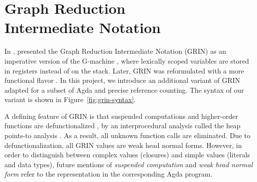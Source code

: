 \documentclass[9pt, twocolumn]{article}
\begin{document}
\section{Graph Reduction \\ Intermediate Notation}
\label{sec:grin}
In \citeyear{johnsson1991}, \citeauthor{johnsson1991} presented the Graph Reduction Intermediate Notation (GRIN) as an imperative version of the G-machine \citep{johnsson1984}, where lexically scoped variables are stored in registers instead of on the stack. 
Later, GRIN was reformulated with a more functional flavor \citep{boquist1995}.
In this project, we introduce an additional variant of GRIN adapted for a subset of Agda and precise reference counting. 
The syntax of our variant is shown in \mbox{Figure \ref{fig:grin-syntax}}.

A defining feature of GRIN is that suspended computations and higher-order functions are defunctionalized \citep{reynolds1972}, by 
an interprocedural analysis called the heap points-to analysis \citep{boquist1999}.
As a result, all unknown function calls are eliminated. 
Due to defunctionalization, all GRIN values are weak head normal forms.
However, in order to distinguish between complex values (closures) and simple values (literals and data types), 
future mentions of \emph{suspended computation} and \emph{weak head normal form} refer to the representation in the corresponding Agda program.
\end{document}
